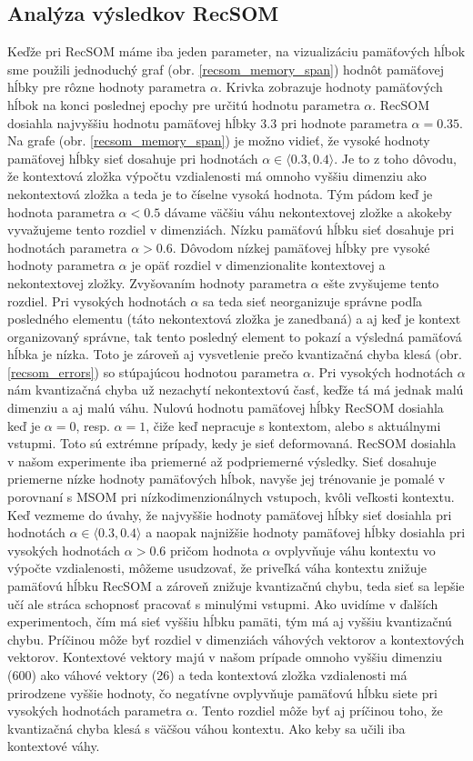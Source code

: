 \subsection{Analýza výsledkov RecSOM}
Keďže pri RecSOM máme iba jeden parameter, na vizualizáciu pamäťových hĺbok sme použili jednoduchý graf (obr. \ref{recsom_memory_span}) hodnôt pamäťovej hĺbky pre rôzne hodnoty parametra $\alpha$.
Krivka zobrazuje hodnoty pamäťových hĺbok na konci poslednej epochy pre určitú hodnotu parametra $\alpha$.
RecSOM dosiahla najvyššiu hodnotu pamäťovej hĺbky $3.3$ pri hodnote parametra $\alpha = 0.35$.
Na grafe (obr. \ref{recsom_memory_span}) je možno vidieť, že vysoké hodnoty pamäťovej hĺbky sieť dosahuje pri hodnotách $\alpha \in \langle 0.3, 0.4 \rangle$. 
Je to z toho dôvodu, že kontextová zložka výpočtu vzdialenosti má omnoho vyššiu dimenziu ako nekontextová zložka a teda je to číselne vysoká hodnota. 
Tým pádom keď je hodnota parametra $\alpha < 0.5$ dávame väčšiu váhu nekontextovej zložke a akokeby vyvažujeme tento rozdiel v dimenziách.
Nízku pamäťovú hĺbku sieť dosahuje pri hodnotách parametra $\alpha > 0.6$.
Dôvodom nízkej pamäťovej hĺbky pre vysoké hodnoty parametra $\alpha$ je opäť rozdiel v dimenzionalite kontextovej a nekontextovej zložky.
Zvyšovaním hodnoty parametra $\alpha$ ešte zvyšujeme tento rozdiel. 
Pri vysokých hodnotách $\alpha$ sa teda sieť neorganizuje správne podľa posledného elementu (táto nekontextová zložka je zanedbaná) a aj keď je kontext organizovaný správne, tak tento posledný element to pokazí a výsledná pamäťová hĺbka je nízka.
Toto je zároveň aj vysvetlenie prečo kvantizačná chyba klesá (obr. \ref{recsom_errors}) so stúpajúcou hodnotou parametra
$\alpha$. Pri vysokých hodnotách $\alpha$ nám kvantizačná chyba už nezachytí nekontextovú časť, keďže tá má jednak malú dimenziu a aj malú váhu.
Nulovú  hodnotu pamäťovej hĺbky RecSOM dosiahla keď je $\alpha = 0$, resp. $\alpha = 1$, čiže keď nepracuje s kontextom, alebo s aktuálnymi vstupmi. 
Toto sú extrémne prípady, kedy je sieť deformovaná.
RecSOM dosiahla v našom experimente iba priemerné až podpriemerné výsledky. Sieť dosahuje priemerne nízke hodnoty pamäťových hĺbok, navyše jej trénovanie je pomalé v porovnaní s MSOM pri nízkodimenzionálnych vstupoch, kvôli veľkosti kontextu.
Keď vezmeme do úvahy, že najvyššie hodnoty pamäťovej hĺbky sieť dosiahla pri hodnotách $\alpha \in \langle 0.3, 0.4 \rangle$ a naopak najnižšie hodnoty pamäťovej hĺbky dosiahla pri vysokých hodnotách $\alpha > 0.6$
pričom hodnota $\alpha$ ovplyvňuje váhu kontextu vo výpočte vzdialenosti, môžeme usudzovať, že priveľká váha kontextu znižuje pamäťovú hĺbku RecSOM a zároveň znižuje kvantizačnú chybu, teda sieť sa lepšie učí ale stráca schopnosť pracovať s minulými vstupmi. 
Ako uvidíme v ďalších experimentoch, čím má sieť vyššiu hĺbku pamäti, tým má aj vyššiu kvantizačnú chybu.
Príčinou môže byť rozdiel v dimenziách váhových vektorov a kontextových vektorov. Kontextové vektory majú v našom prípade omnoho vyššiu dimenziu (600) ako váhové vektory (26) a 
teda kontextová zložka vzdialenosti má prirodzene vyššie hodnoty, čo negatívne ovplyvňuje pamäťovú hĺbku siete pri vysokých hodnotách parametra $\alpha$.
Tento rozdiel môže byť aj príčinou toho, že kvantizačná chyba klesá s väčšou váhou kontextu. Ako keby sa učili iba kontextové váhy.


